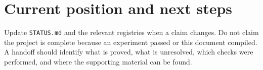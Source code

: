 \section{Current position and next steps}\label{sec:next}


Update \texttt{STATUS.md} and the relevant registries when a claim changes.
Do not claim the project is complete because an experiment passed or this
document compiled. A handoff should identify what is proved, what is unresolved,
which checks were performed, and where the supporting material can be found.

